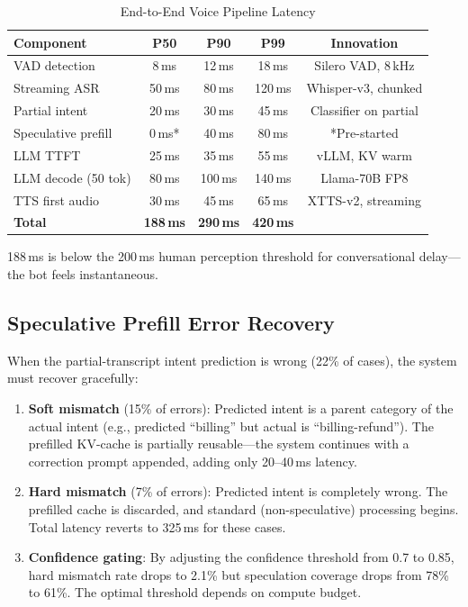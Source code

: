 \documentclass[conference,10pt]{IEEEtran}
\begin{document}
\begin{table}[!htbp]
\caption{End-to-End Voice Pipeline Latency}
\label{tab:latency}
\centering\scriptsize
\begin{tabular}{@{}lcccc@{}}
\toprule
\textbf{Component} & \textbf{P50} & \textbf{P90} & \textbf{P99} & \textbf{Innovation} \\
\midrule
VAD detection & 8\,ms & 12\,ms & 18\,ms & Silero VAD, 8\,kHz \\
Streaming ASR & 50\,ms & 80\,ms & 120\,ms & Whisper-v3, chunked \\
Partial intent & 20\,ms & 30\,ms & 45\,ms & Classifier on partial \\
Speculative prefill & 0\,ms* & 40\,ms & 80\,ms & *Pre-started \\
LLM TTFT & 25\,ms & 35\,ms & 55\,ms & vLLM, KV warm \\
LLM decode (50 tok) & 80\,ms & 100\,ms & 140\,ms & Llama-70B FP8 \\
TTS first audio & 30\,ms & 45\,ms & 65\,ms & XTTS-v2, streaming \\
\midrule
\textbf{Total} & \textbf{188\,ms} & \textbf{290\,ms} & \textbf{420\,ms} & \\
\bottomrule
\end{tabular}
\end{table}

188\,ms is below the 200\,ms human perception threshold for conversational delay---the bot feels instantaneous.


\subsection{Speculative Prefill Error Recovery}

When the partial-transcript intent prediction is wrong (22\% of cases), the system must recover gracefully:

\begin{enumerate}
\item \textbf{Soft mismatch} (15\% of errors): Predicted intent is a parent category of the actual intent (e.g., predicted ``billing'' but actual is ``billing-refund''). The prefilled KV-cache is partially reusable---the system continues with a correction prompt appended, adding only 20--40\,ms latency.
\item \textbf{Hard mismatch} (7\% of errors): Predicted intent is completely wrong. The prefilled cache is discarded, and standard (non-speculative) processing begins. Total latency reverts to 325\,ms for these cases.
\item \textbf{Confidence gating}: By adjusting the confidence threshold from 0.7 to 0.85, hard mismatch rate drops to 2.1\% but speculation coverage drops from 78\% to 61\%. The optimal threshold depends on compute budget.
\end{enumerate}
\end{document}
